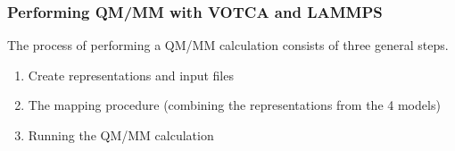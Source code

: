 \documentclass[t,aspectratio=169, 8pt]{beamer}
\begin{document}
\begin{chapterframe}
  \frametitle{Performing QM/MM with VOTCA and LAMMPS}
  The process of performing a QM/MM calculation consists of three general steps.
  \begin{enumerate}
    \item Create representations and input files
    \item The mapping procedure (combining the representations from the 4 models)
    \item Running the QM/MM calculation
  \end{enumerate}
\end{chapterframe}
\end{document}
